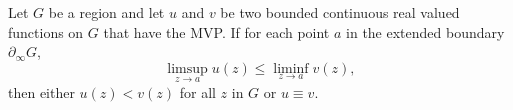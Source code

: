 Let $G$ be a region and let $u$ and $v$ be two bounded continuous real valued functions on $G$ that have the MVP. If for each point $a$ in the extended boundary $\partial_\infty G$,
$$\limsup_{z \to a} u(z) \leq \liminf_{z \to a} v(z),$$
then either $u(z) < v(z)$ for all $z$ in $G$ or $u \equiv v$.

